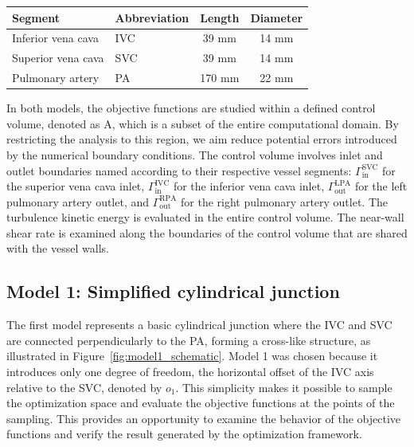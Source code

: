 \bgroup
\centering
\vspace{4mm}
\setlength\tabcolsep{3mm}
\def\arraystretch{1.7}%
\begin{tabular}{|l|l|c|c|}
	\hline
	Segment & Abbreviation & Length & Diameter \\ \hline
	Inferior vena cava 	& IVC 	&      39 mm        &     14 mm    \\ 
	Superior vena cava  & SVC 	&      39 mm     	&     14 mm     \\ 
	Pulmonary artery 	& PA 	&      170 mm     	&     22 mm     \\  \hline
\end{tabular}
\vspace{2mm}
\vspace{4mm}
\label{tab:tcpc dims}
\egroup

In both models, the objective functions are studied within a defined control volume, denoted as A, which is a subset of the entire computational domain. By restricting the analysis to this region, we aim reduce potential errors introduced by the numerical boundary conditions. The control volume involves inlet and outlet boundaries named according to their respective vessel segments: \(\Gamma^{\text{SVC}}_{\text{in}}\) for the superior vena cava inlet, \(\Gamma^{\text{IVC}}_{\text{in}}\) for the inferior vena cava inlet, \(\Gamma^{\text{LPA}}_{\text{out}}\) for the left pulmonary artery outlet, and \(\Gamma^{\text{RPA}}_{\text{out}}\) for the right pulmonary artery outlet. The turbulence kinetic energy is evaluated in the entire control volume. The near-wall shear rate is examined along the boundaries of the control volume that are shared with the vessel walls.

\subsection*{Model 1: Simplified cylindrical junction}\label{mod:model1}
The first model represents a basic cylindrical junction where the IVC and SVC are connected perpendicularly to the PA, forming a cross-like structure, as illustrated in Figure~\ref{fig:model1_schematic}. Model 1 was chosen because it introduces only one degree of freedom, the horizontal offset of the IVC axis relative to the SVC, denoted by $o_1$. This simplicity makes it possible to sample the optimization space and evaluate the objective functions at the points of the sampling. This provides an opportunity to examine the behavior of the objective functions and verify the result generated by the optimization framework.

